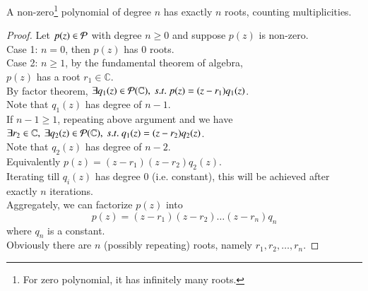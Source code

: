 \documentclass[11pt]{article}
\begin{document}
	\begin{theorem}
		A non-zero\footnote{For zero polynomial, it has infinitely many roots.} polynomial of degree $n$ has exactly $n$ roots, counting multiplicities.
	\end{theorem}
	\begin{proof}
		Let $p(z) \in \mathcal{{P}}$ with degree $n \geq 0$ and suppose $p(z)$ is non-zero. \\
		Case 1: $n=0$, then $p(z)$ has 0 roots. \\
		Case 2: $n \geq 1$, by the fundamental theorem of algebra, \\
		$p(z)$ has a root $r_1 \in \mathbb{C}$. \\
		By factor theorem, $\exists q_1(z) \in \mathcal{{P}}(\mathbb{C}),\ s.t.\ p(z) = (z-r_1)q_1(z)$. \\
		Note that $q_1(z)$ has degree of $n-1$. \\
		If $n-1 \geq 1$, repeating above argument and we have \\
		$\exists r_2 \in \mathbb{C},\ \exists q_2(z) \in \mathcal{{P}}(\mathbb{C}),\ s.t.\ q_1(z) = (z-r_2)q_2(z)$. \\
		Note that $q_2(z)$ has degree of $n-2$. \\
		Equivalently $p(z) = (z-r_1)(z-r_2)q_2(z)$. \\
		Iterating till $q_i(z)$ has degree 0 (i.e. constant), this will be achieved after exactly $n$ iterations. \\
		Aggregately, we can factorize $p(z)$ into 
		\[
			p(z) = (z-r_1)(z-r_2)\dots(z-r_n)q_n
		\]
		where $q_n$ is a constant. \\
		Obviously there are $n$ (possibly repeating) roots, namely $r_1, r_2, \dots, r_n$.
	\end{proof}
\end{document}
